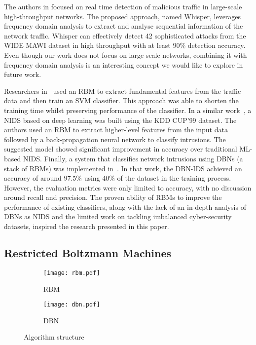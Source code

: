 \documentclass[runningheads]{llncs}
\begin{document}
The authors in \cite{Whisper} focused on real time detection of malicious traffic in large-scale high-throughput networks. The proposed approach, named Whisper, leverages frequency domain analysis to extract and analyse sequential information of the network traffic. Whisper can effectively detect 42 sophisticated attacks from the WIDE MAWI dataset in high throughput with at least $90\%$ detection accuracy. Even though our work does not focus on large-scale networks, combining it with frequency domain analysis is an interesting concept we would like to explore in future work. 

Researchers in~\cite{Yang} used an \ac{RBM} to extract fundamental features from the traffic data and then train an \ac{SVM} classifier. This approach was able to shorten the training time whilst preserving performance of the classifier. In a similar work~\cite{Peng}, a \ac{NIDS} based on deep learning was built using the KDD CUP'99 dataset. The authors used an \ac{RBM} to extract higher-level features from the input data followed by a back-propagation neural network to classify intrusions. The suggested model showed significant improvement in accuracy over traditional ML-based \ac{NIDS}. Finally, a system that classifies network intrusions using \acp{DBN} (a stack of \acp{RBM}) was implemented in~\cite{Alom}. In that work, the \ac{DBN}-\ac{IDS} achieved an accuracy of around $97.5$\% using $40$\% of the dataset in the training process. However, the evaluation metrics were only limited to accuracy, with no discussion around recall and precision. The proven ability of \acp{RBM} to improve the performance of existing classifiers, along with the lack of an in-depth analysis of \acp{DBN} as \ac{NIDS} and the limited work on tackling imbalanced cyber-security datasets, inspired the research presented in this paper.  


\subsection{Restricted Boltzmann Machines}
\label{subsec:rbm}

\begin{figure}[t]
\begin{subfigure}[b]{0.49\textwidth}
    \centering
    \texttt{[image: rbm.pdf]}
    \caption{\ac{RBM}}
    \label{subfig:rbm}
\end{subfigure}
\hfill
\begin{subfigure}[b]{0.49\textwidth}
    \centering
    \texttt{[image: dbn.pdf]}
    \caption{\ac{DBN}}
    \label{subfig:dbn}
\end{subfigure}
\caption{Algorithm structure}
\label{fig:algorithm structure}
\end{figure}
\end{document}
